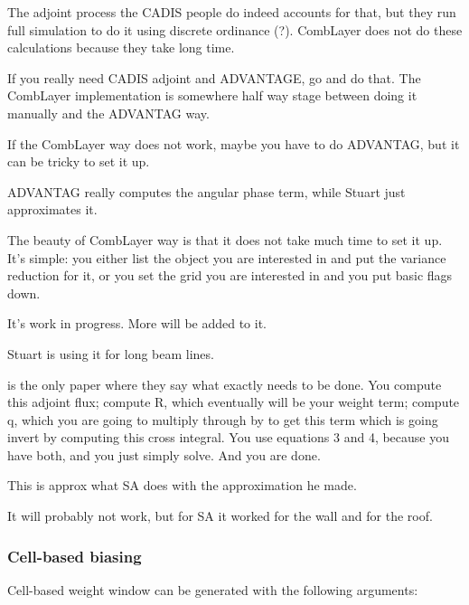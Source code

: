 The adjoint process the CADIS people do indeed accounts for that, but they run full simulation to do it using discrete ordinance (?).
CombLayer does not do these calculations because they take long time.

If you really need CADIS adjoint and ADVANTAGE, go and do that.
The CombLayer implementation is somewhere half way stage between doing it manually and the ADVANTAG way.


If the CombLayer way does not work, maybe you have to do ADVANTAG, but it can be tricky to set it up.

ADVANTAG really computes the angular phase term, while Stuart just approximates it.

The beauty of CombLayer way is that it does not take much time to set it up. It's simple: you either list the object you are interested in and put the variance reduction for it,
or you set the grid you are interested in and you put basic flags down.

It's work in progress. More will be added to it.

Stuart is using it for long beam lines.




\cite{arXiv:1612.00793} is the only paper where they say what exactly needs to be done.
You compute this adjoint flux;
compute R, which eventually will be your weight term;
compute q, which you are going to multiply through by to get this term which is going invert by computing this cross integral.
You use equations 3 and 4, because you have both, and you just simply solve. And you are done.

This is approx what SA does with the approximation he made.

It will probably not work, but for SA it worked for the wall and for the roof.

\subsubsection{Cell-based biasing}
\label{sec:vr:cell}

Cell-based weight window can be generated with the following arguments:

